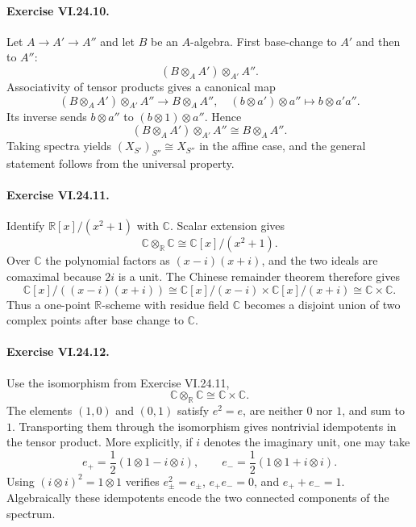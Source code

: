\paragraph{Exercise VI.24.10.}
\begin{solution}
Let $A\to A'\to A''$ and let $B$ be an $A$-algebra.  First base-change to $A'$ and then to $A''$:
\[
(B\otimes_AA')\otimes_{A'}A''.
\]
Associativity of tensor products gives a canonical map
\[
(B\otimes_AA')\otimes_{A'}A''\longrightarrow B\otimes_AA'',
\quad (b\otimes a')\otimes a''\longmapsto b\otimes a'a''.
\]
Its inverse sends $b\otimes a''$ to $(b\otimes1)\otimes a''$.  Hence
\[
(B\otimes_AA')\otimes_{A'}A''\cong B\otimes_AA''.
\]
Taking spectra yields $(X_{S'})_{S''}\cong X_{S''}$ in the affine case, and the general statement
follows from the universal property.
\end{solution}

\paragraph{Exercise VI.24.11.}
\begin{solution}
Identify $\mathbb R[x]/(x^2+1)$ with $\mathbb C$.  Scalar extension gives
\[
\mathbb C\otimes_{\mathbb R}\mathbb C
\cong \mathbb C[x]/(x^2+1).
\]
Over $\mathbb C$ the polynomial factors as $(x-i)(x+i)$, and the two ideals are comaximal because
$2i$ is a unit.  The Chinese remainder theorem therefore gives
\[
\mathbb C[x]/((x-i)(x+i))
\cong\mathbb C[x]/(x-i)\times\mathbb C[x]/(x+i)
\cong\mathbb C\times\mathbb C.
\]
Thus a one-point $\mathbb R$-scheme with residue field $\mathbb C$ becomes a disjoint union of two
complex points after base change to $\mathbb C$.
\end{solution}

\paragraph{Exercise VI.24.12.}
\begin{solution}
Use the isomorphism from Exercise VI.24.11,
\[
\mathbb C\otimes_{\mathbb R}\mathbb C\cong\mathbb C\times\mathbb C.
\]
The elements $(1,0)$ and $(0,1)$ satisfy $e^2=e$, are neither $0$ nor $1$, and sum to $1$.
Transporting them through the isomorphism gives nontrivial idempotents in the tensor product.  More
explicitly, if $i$ denotes the imaginary unit, one may take
\[
e_+=\frac12(1\otimes1-i\otimes i),\qquad
e_-=\frac12(1\otimes1+i\otimes i).
\]
Using $(i\otimes i)^2=1\otimes1$ verifies $e_\pm^2=e_\pm$, $e_+e_-=0$, and
$e_++e_-=1$.  Algebraically these idempotents encode the two connected components of the spectrum.
\end{solution}

